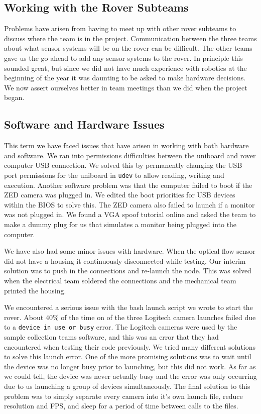 \documentclass[10pt, oneside,onecolumn]{IEEEtran}
\begin{document}
\begin{titlepage}
\subsection{Working with the Rover Subteams}
Problems have arisen from having to meet up with other rover subteams to discuss where the team is in the project. Communication between the three teams about what sensor systems will be on the rover can be difficult. The other teams gave us the go ahead to add any sensor systems to the rover. In principle this sounded great, but since we did not have much experience with robotics at the beginning of the year it was daunting to be asked to make hardware decisions. We now assert ourselves better in team meetings than we did when the project began.

\subsection{Software and Hardware Issues}
This term we have faced issues that have arisen in working with both hardware and software. We ran into permissions difficulties between the uniboard and rover computer USB connection. We solved this by permanently changing the USB port permissions for the uniboard in \texttt{udev} to allow reading, writing and execution. Another software problem was that the computer failed to boot if the ZED camera was plugged in. We edited the boot priorities for USB devices within the BIOS to solve this. The ZED camera also failed to launch if a monitor was not plugged in. We found a VGA spoof tutorial online and asked the team to make a dummy plug for us that simulates a monitor being plugged into the computer.

We have also had some minor issues with hardware. When the optical flow sensor did not have a housing it continuously disconnected while testing. Our interim solution was to push in the connections and re-launch the node. This was solved when the electrical team soldered the connections and the mechanical team printed the housing. 

 We encountered a serious issue with the bash launch script we wrote to start the rover. About 40\% of the time on of the three Logitech camera launches failed due to a \texttt{device in use or busy} error. The Logitech cameras were used by the sample collection teams software, and this was an error that they had encountered when testing their code previously. We tried many different solutions to solve this launch error. One of the more promising solutions was to wait until the device was no longer busy prior to launching, but this did not work. As far as we could tell, the device was never actually busy and the error was only occurring due to us launching a group of devices simultaneously. The final solution to this problem was to simply separate every camera into it's own launch file, reduce resolution and FPS, and sleep for a period of time between calls to the files. 


\end{titlepage}
\end{document}
